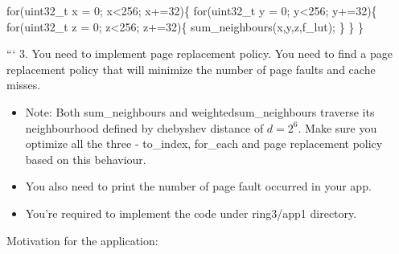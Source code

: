 \documentclass[]{book}
\begin{document}
for(uint32\_t x = 0; x\textless{}256; x+=32)\{ for(uint32\_t y = 0;
y\textless{}256; y+=32)\{ for(uint32\_t z = 0; z\textless{}256; z+=32)\{
sum\_neighbours(x,y,z,f\_lut); \} \} \}

``` 3. You need to implement page replacement policy. You need to find a
page replacement policy that will minimize the number of page faults and
cache misses.

\begin{itemize}
\itemsep1pt\parskip0pt
\item
  Note: Both sum\_neighbours and weightedsum\_neighbours traverse its
  neighbourhood defined by chebyshev distance of \(d=2^6\). Make sure
  you optimize all the three - to\_index, for\_each and page replacement
  policy based on this behaviour.
\item
  You also need to print the number of page fault occurred in your app.
\item
  You're required to implement the code under ring3/app1 directory.
\end{itemize}

Motivation for the application:
\end{document}
